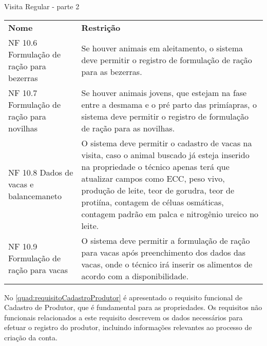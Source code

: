 \begin{tabframed}[!htb]
  \caption{Visita Regular - parte 2}
  \label{quad:requisitoVisitaRegularParte2}
  \renewcommand{\arraystretch}{1.5}
  \begin{tabular}{|l|l|}
    \cline{1-2}

    \textbf{Nome}                                                                       &
    \textbf{Restrição}
    \\ \cline{1-2}

    \multicolumn{1}{|p{3.2cm}|}{\raggedright NF 10.6 Formulação de ração para bezerras} &
    \multicolumn{1}{|p{12cm}|}{\raggedright Se houver animais em aleitamento, o sistema deve permitir o registro de formulação de ração para as bezerras.}
    \\ \cline{1-2}

    \multicolumn{1}{|p{3cm}|}{\raggedright NF 10.7 Formulação de ração para novilhas}   &
    \multicolumn{1}{|p{12cm}|}{\raggedright Se houver animais jovens, que estejam na fase entre a desmama e o pré parto das primíapras, o sistema deve permitir o registro de formulação de ração para as novilhas.}
    \\ \cline{1-2}

    \multicolumn{1}{|p{3cm}|}{\raggedright NF 10.8 Dados de vacas e balancemaneto}      &
    \multicolumn{1}{|p{12cm}|}{\raggedright O sistema deve permitir o cadastro de vacas na visita, caso o animal buscado já esteja inserido na propriedade o técnico apenas terá que atualizar campos como \gls{ECC}, peso vivo, produção de leite, teor de gorudra, teor de protiína, contagem de céluas osmáticas, contagem padrão em palca e nitrogênio ureico no leite.}
    \\ \cline{1-2}

    \multicolumn{1}{|p{3cm}|}{\raggedright NF 10.9 Formulação de ração para vacas}      &
    \multicolumn{1}{|p{12cm}|}{\raggedright O sistema deve permitir a formulação de ração para vacas após preenchimento dos dados das vacas, onde o técnico irá inserir os alimentos de acordo com a disponibilidade.}
    \\ \cline{1-2}
  \end{tabular}
  \fonte{} %
\end{tabframed}

\clearpage

No \autoref{quad:requisitoCadastroProdutor} é apresentado o requisito funcional de Cadastro de Produtor, que é fundamental para as propriedades. Os requisitos não funcionais relacionados a este requisito descrevem os dados necessários para efetuar o registro do produtor, incluindo informações relevantes ao processo de criação da conta.


